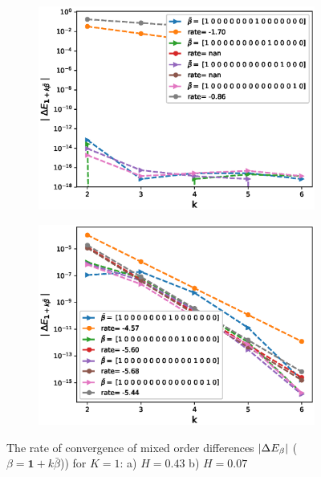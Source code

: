 \documentclass[11pt]{article}
\begin{document}
\begin{figure}[h!]
	\centering
	\begin{subfigure}{.5\textwidth}
		\centering
		\includegraphics[width=1\linewidth]{./figures/effect_H_differences/hierarchical/H_043/N_8/mixed_difference_order2_rbergomi_8steps_H_043_K_1_hierarch_with_rate_W2}
		\caption{}
		\label{fig:sub3}
	\end{subfigure}%
	\begin{subfigure}{.5\textwidth}
		\centering
		\includegraphics[width=1\linewidth]{./figures/effect_H_differences/hierarchical/H_007/N_8/mixed_difference_order2_rbergomi_8steps_H_007_K_1_hierarch_with_rate_W2}
		\caption{}
		\label{fig:sub4}
	\end{subfigure}
	
	\caption{The rate of convergence of  mixed order differences $\left\lvert\Delta E_{\beta}\right\rvert$ ($\beta=\mathbf{1}+k \bar{\beta}$)) for $K=1$: a) $H=0.43$ b)  $H=0.07$}
	\label{fig:test2}
\end{figure}
\end{document}
